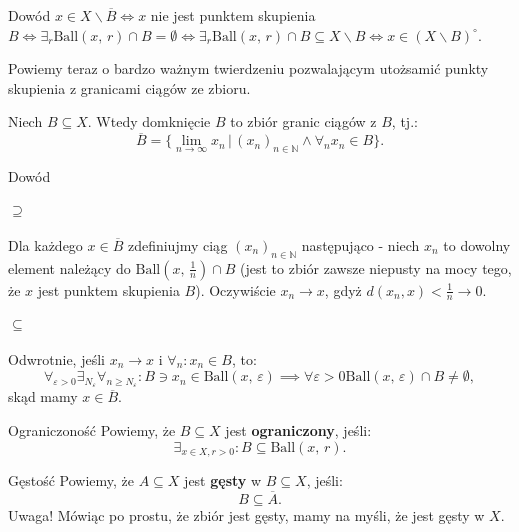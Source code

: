 \documentclass{article}
\newcounter{defi}
\numberwithin{defi}{section}
\numberwithin{defi}{section}
\newcommand{\N}{\mathbb{N}}
\newcommand{\oo}{\infty}
\newcommand{\dg}{^{\circ}}
\providecommand{\eps}{\varepsilon}
\providecommand{\dg}{^\circ}
\newcommand{\ciag}[1]{(#1_{n})_{n \in \N}}
\newcommand{\ball}[2]{\text{Ball}(#1, \, #2)}
\begin{document}
\begin{dow}{Dowód}
    $x \in X \backslash \overline{B} \iff x$ nie jest punktem skupienia $B \iff \exists_r \ball{x}{r} \cap B = \emptyset \iff \exists_r \ball{x}{r} \cap B \subseteq X \backslash B \iff x \in (X \backslash B) \dg$.
\end{dow}


Powiemy teraz o bardzo ważnym twierdzeniu pozwalającym utożsamić punkty skupienia z granicami ciągów ze zbioru.
\begin{twier}{}
    Niech $B \subseteq X$. Wtedy domknięcie $B$ to zbiór granic ciągów z $B$, tj.: \begin{equation}
        \overline{B} = \{ \lim_{n\to \oo} x_n \,  \big| \, \ciag{x} \wedge \forall_n x_n \in B \}.
    \end{equation}
\end{twier}

\begin{dow}{Dowód}
    \paragraph{$\supseteq$} Dla każdego $x \in \overline{B}$ zdefiniujmy ciąg $\ciag{x}$ następująco - niech $x_n$ to dowolny element należący do $\ball{x}{\frac{1}{n}} \cap B$ (jest to zbiór zawsze niepusty na mocy tego, że $x$ jest punktem skupienia $B$). Oczywiście $ x_n \to x$, gdyż $d(x_n, x) < \frac{1}{n} \to 0$.
    \paragraph{$\subseteq$} Odwrotnie, jeśli $x_n \to x$ i $\forall_n : x_n \in B$, to: \begin{equation}
        \forall_{\eps > 0} \exists_{N_\eps} \forall_{n \geqslant N_\eps}: B \ni x_n \in \ball{x}{\eps} \implies \forall{\eps >0} \ball{x}{\eps} \cap B \neq \emptyset,
    \end{equation} skąd mamy $x \in \overline{B}$.
\end{dow}

\begin{defr}{Ograniczoność}
    Powiemy, że $B \subseteq X$ jest \textbf{ograniczony}, jeśli: \begin{equation}
        \exists_{x \in X, r >0}: B \subseteq \ball{x}{r}.
    \end{equation}
\end{defr}

\begin{defr}{Gęstość}
    Powiemy, że $A \subseteq X$ jest \textbf{gęsty} w $B \subseteq X$, jeśli: \begin{equation}
        B \subseteq \overline{A}.
    \end{equation}
    Uwaga! Mówiąc po prostu, że zbiór jest gęsty, mamy na myśli, że jest gęsty w $X$.
\end{defr}
\end{document}
